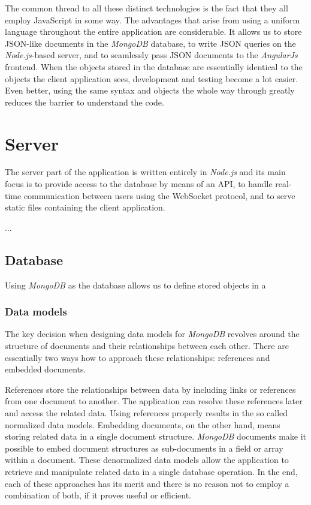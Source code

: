 \documentclass[thesis=M,english,hidelinks]{FITthesis}[2012/10/20]
\begin{document}
The common thread to all these distinct technologies is the fact that they all employ JavaScript in some way. The advantages that arise from using a uniform language throughout the entire application are considerable. It allows us to store JSON-like documents in the \textit{MongoDB} database, to write JSON queries on the \textit{Node.js}-based server, and to seamlessly pass JSON documents to the \textit{AngularJs} frontend. When the objects stored in the database are essentially identical to the objects the client application sees, development and testing become a lot easier. Even better, using the same syntax and objects the whole way through greatly reduces the barrier to understand the code.

  \section{Server}

The server part of the application is written entirely in \textit{Node.js} and its main focus is to provide access to the database by means of an API, to handle real-time communication between users using the WebSocket protocol, and to serve static files containing the client application.

      ...

    \subsection{Database}

Using \textit{MongoDB} as the database allows us to define stored objects in a

      \subsubsection{Data models}

The key decision when designing data models for \textit{MongoDB} revolves around the structure of documents and their relationships between each other. There are essentially two ways how to approach these relationships: references and embedded documents.

References store the relationships between data by including links or references from one document to another. The application can resolve these references later and access the related data. Using references properly results in the so called normalized data models. Embedding documents, on the other hand, means storing related data in a single document structure. \textit{MongoDB} documents make it possible to embed document structures as sub-documents in a field or array within a document. These denormalized data models allow the application to retrieve and manipulate related data in a single database operation. In the end, each of these approaches has its merit and there is no reason not to employ a combination of both, if it proves useful or efficient.
\end{document}
